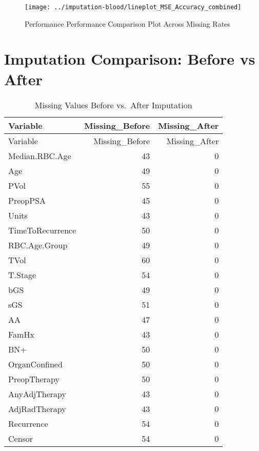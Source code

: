\documentclass[
]{article}
\begin{document}
\begin{figure}[H]

{\centering \texttt{[image: ../imputation-blood/lineplot\_MSE\_Accuracy\_combined]} 

}

\caption{Performance Performance Comparison Plot Across Missing Rates}\label{fig:show-performance-lineplot}
\end{figure}

\section{Imputation Comparison: Before vs
After}\label{imputation-comparison-before-vs-after}

\begin{longtable}[]{@{}lrr@{}}
\caption{Missing Values Before vs.~After Imputation}\tabularnewline
\toprule\noalign{}
Variable & Missing\_Before & Missing\_After \\
\midrule\noalign{}
\endfirsthead
\toprule\noalign{}
Variable & Missing\_Before & Missing\_After \\
\midrule\noalign{}
\endhead
\bottomrule\noalign{}
\endlastfoot
Median.RBC.Age & 43 & 0 \\
Age & 49 & 0 \\
PVol & 55 & 0 \\
PreopPSA & 45 & 0 \\
Units & 43 & 0 \\
TimeToRecurrence & 50 & 0 \\
RBC.Age.Group & 49 & 0 \\
TVol & 60 & 0 \\
T.Stage & 54 & 0 \\
bGS & 49 & 0 \\
sGS & 51 & 0 \\
AA & 47 & 0 \\
FamHx & 43 & 0 \\
BN+ & 50 & 0 \\
OrganConfined & 50 & 0 \\
PreopTherapy & 50 & 0 \\
AnyAdjTherapy & 43 & 0 \\
AdjRadTherapy & 43 & 0 \\
Recurrence & 54 & 0 \\
Censor & 54 & 0 \\
\end{longtable}
\end{document}
